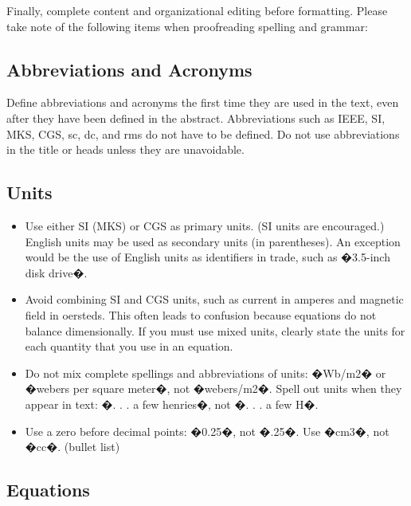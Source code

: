 \documentclass[letterpaper, 10 pt, conference]{IEEEconf}  %
\begin{document}
        Finally, complete content and organizational editing before formatting. Please take note of the following items when proofreading spelling and grammar:
        
        \subsection{Abbreviations and Acronyms} Define abbreviations and acronyms the first time they are used in the text, even after they have been defined in the abstract. Abbreviations such as IEEE, SI, MKS, CGS, sc, dc, and rms do not have to be defined. Do not use abbreviations in the title or heads unless they are unavoidable.
        
        \subsection{Units}
        
        \begin{itemize}
        
        \item Use either SI (MKS) or CGS as primary units. (SI units are encouraged.) English units may be used as secondary units (in parentheses). An exception would be the use of English units as identifiers in trade, such as �3.5-inch disk drive�.
        \item Avoid combining SI and CGS units, such as current in amperes and magnetic field in oersteds. This often leads to confusion because equations do not balance dimensionally. If you must use mixed units, clearly state the units for each quantity that you use in an equation.
        \item Do not mix complete spellings and abbreviations of units: �Wb/m2� or �webers per square meter�, not �webers/m2�.  Spell out units when they appear in text: �. . . a few henries�, not �. . . a few H�.
        \item Use a zero before decimal points: �0.25�, not �.25�. Use �cm3�, not �cc�. (bullet list)
        
        \end{itemize}
        
        
        \subsection{Equations}
        
\end{document}
